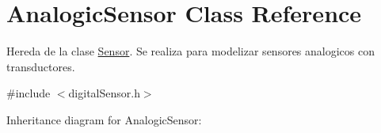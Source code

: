 \hypertarget{classAnalogicSensor}{}\section{Analogic\+Sensor Class Reference}
\label{classAnalogicSensor}


Hereda de la clase \hyperlink{classSensor}{Sensor}. Se realiza para modelizar sensores analogicos con transductores.  




{\ttfamily \#include $<$digital\+Sensor.\+h$>$}



Inheritance diagram for Analogic\+Sensor\+:
